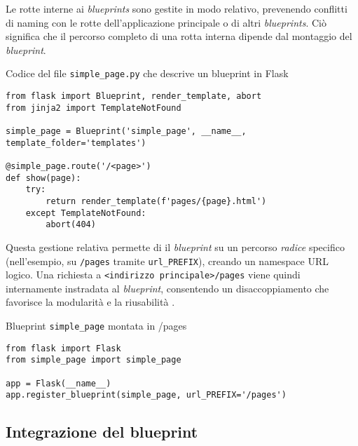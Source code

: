 Le rotte interne ai \textit{blueprints} sono gestite in modo relativo, prevenendo conflitti di naming con le rotte dell'applicazione principale o di altri \textit{blueprints}. Ciò significa che il percorso completo di una rotta interna dipende dal montaggio del \textit{blueprint}.

\begin{listing}[!ht]
\caption{Codice del file \texttt{simple\_page.py} che descrive un blueprint in Flask}
\label{lst:flask-blueprint} %
\begin{verbatim}
from flask import Blueprint, render_template, abort
from jinja2 import TemplateNotFound

simple_page = Blueprint('simple_page', __name__, template_folder='templates')

@simple_page.route('/<page>')
def show(page):
    try:
        return render_template(f'pages/{page}.html')
    except TemplateNotFound:
        abort(404)
\end{verbatim}
\end{listing}

Questa gestione relativa permette di  il \textit{blueprint} su un percorso \textit{radice} specifico (nell'esempio, su \texttt{/pages} tramite \texttt{url\_PREFIX}), creando un namespace URL logico. Una richiesta a \texttt{<indirizzo principale>/pages} viene quindi internamente instradata al \textit{blueprint}, consentendo un disaccoppiamento che favorisce la modularità e la riusabilità \cite{palets_blueprints}.

\begin{listing}[!ht]
\caption{Blueprint \texttt{simple\_page} montata in /pages}
\label{lst:python_blueprint_registration} %
\begin{verbatim}
from flask import Flask
from simple_page import simple_page

app = Flask(__name__)
app.register_blueprint(simple_page, url_PREFIX='/pages')
\end{verbatim}
\end{listing}

\subsection{Integrazione del blueprint}


